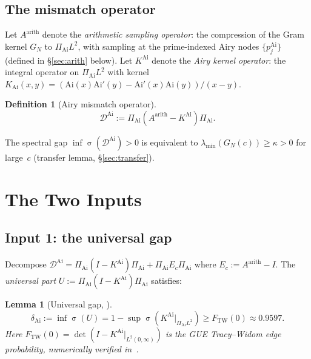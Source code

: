 \documentclass[12pt,a4paper]{amsart}
\newtheorem{lemma}[theorem]{Lemma}
\theoremstyle{definition}
\newtheorem{definition}[theorem]{Definition}
\newcommand{\KAi}{K^{\mathrm{Ai}}}
\newcommand{\DAi}{\mathcal{D}^{\mathrm{Ai}}}
\newcommand{\PAi}{\Pi_{\mathrm{Ai}}}
\newcommand{\GN}{G_N(c)}
\newcommand{\Ec}{E_c}
\DeclareMathOperator{\spec}{\sigma}
\begin{document}
\subsection{The mismatch operator}

Let $A^{\mathrm{arith}}$ denote the \emph{arithmetic sampling operator}:
the compression of the Gram kernel $G_N$ to $\PAi L^2$,
with sampling at the prime-indexed Airy nodes $\{p_j^{\mathrm{Ai}}\}$
(defined in \S\ref{sec:arith} below).
Let $\KAi$ denote the \emph{Airy kernel operator}:
the integral operator on $\PAi L^2$ with kernel
$K_{\mathrm{Ai}}(x,y) = (\mathrm{Ai}(x)\mathrm{Ai}'(y) - \mathrm{Ai}'(x)\mathrm{Ai}(y))/(x-y)$.

\begin{definition}[Airy mismatch operator]\label{def:mismatch}
\begin{equation}\label{eq:mismatch}
  \DAi := \PAi(A^{\mathrm{arith}} - \KAi)\PAi.
\end{equation}
\end{definition}

The spectral gap $\inf\spec(\DAi) > 0$ is equivalent to
$\lambda_{\min}(\GN) \ge \kappa > 0$ for large~$c$
(transfer lemma, \S\ref{sec:transfer}).

\section{The Two Inputs}
\label{sec:inputs}

\subsection{Input 1: the universal gap}

Decompose $\DAi = \PAi(I - \KAi)\PAi + \PAi \Ec \PAi$
where $\Ec := A^{\mathrm{arith}} - I$.
The \emph{universal part} $U := \PAi(I - \KAi)\PAi$ satisfies:

\begin{lemma}[Universal gap, \cite{TW1994,Bornemann2010}]\label{lem:tw}
\begin{equation}\label{eq:universal}
  \delta_{\mathrm{Ai}} := \inf\spec(U)
  = 1 - \sup\spec(\KAi|_{\PAi L^2})
  \ge F_{\mathrm{TW}}(0) \approx 0.9597.
\end{equation}
Here $F_{\mathrm{TW}}(0) = \det(I - \KAi|_{L^2(0,\infty)})$ is the
GUE Tracy--Widom edge probability, numerically verified in~\cite{Bornemann2010}.
\end{lemma}
\end{document}
